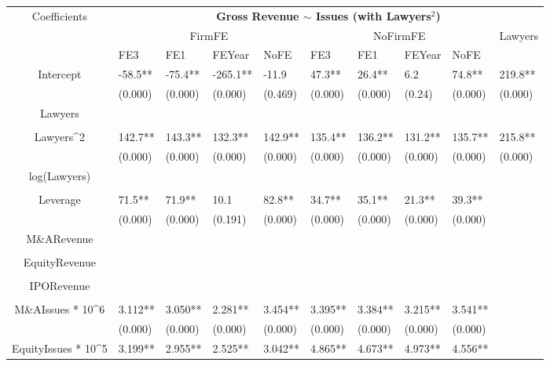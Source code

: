 \documentclass{article}
\begin{document}
\begin{table}[H]
\centering
\begin{tabular}{|clllllllll|}
\hline
\multirow{3}{*}{Coefficients} & \multicolumn{9}{c|}{\textbf{Gross Revenue $\sim$ Issues (with Lawyers$^2$)}} \\
\cline{2-10}
& \multicolumn{4}{c}{FirmFE} & \multicolumn{4}{c}{NoFirmFE} & \multirow{2}{*}{Lawyers} \\
\cline{2-9}
& FE3 & FE1 & FEYear & NoFE & FE3 & FE1 & FEYear & NoFE &  \\
\hline
 
Intercept & -58.5** & -75.4** & -265.1** & -11.9 & 47.3** & 26.4** & 6.2 & 74.8** & 219.8** \\ 
   & (0.000) & (0.000) & (0.000) & (0.469) & (0.000) & (0.000) & (0.24) & (0.000) & (0.000) \\ 
  Lawyers &  &  &  &  &  &  &  &  &  \\ 
   &  &  &  &  &  &  &  &  &  \\ 
  Lawyers^2 & 142.7** & 143.3** & 132.3** & 142.9** & 135.4** & 136.2** & 131.2** & 135.7** & 215.8** \\ 
   & (0.000) & (0.000) & (0.000) & (0.000) & (0.000) & (0.000) & (0.000) & (0.000) & (0.000) \\ 
  log(Lawyers) &  &  &  &  &  &  &  &  &  \\ 
   &  &  &  &  &  &  &  &  &  \\ 
  Leverage & 71.5** & 71.9** & 10.1 & 82.8** & 34.7** & 35.1** & 21.3** & 39.3** &  \\ 
   & (0.000) & (0.000) & (0.191) & (0.000) & (0.000) & (0.000) & (0.000) & (0.000) &  \\ 
  M\&ARevenue &  &  &  &  &  &  &  &  &  \\ 
   &  &  &  &  &  &  &  &  &  \\ 
  EquityRevenue &  &  &  &  &  &  &  &  &  \\ 
   &  &  &  &  &  &  &  &  &  \\ 
  IPORevenue &  &  &  &  &  &  &  &  &  \\ 
   &  &  &  &  &  &  &  &  &  \\ 
  M\&AIssues * 10^6 & 3.112** & 3.050** & 2.281** & 3.454** & 3.395** & 3.384** & 3.215** & 3.541** &  \\ 
   & (0.000) & (0.000) & (0.000) & (0.000) & (0.000) & (0.000) & (0.000) & (0.000) &  \\ 
  EquityIssues * 10^5 & 3.199** & 2.955** & 2.525** & 3.042** & 4.865** & 4.673** & 4.973** & 4.556** &  \\ 

\end{tabular}
\end{table}
\end{document}
